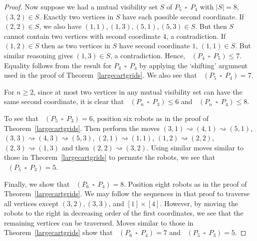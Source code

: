 \documentclass[10pt,a4paper]{amsart}
\DeclareMathOperator{\cmobmv}{Mob^*_{\mu}}
\DeclareMathOperator{\cp}{\,\square\,}
\DeclareMathOperator{\mobmv}{Mob_{\mu}}
\newcommand{\move}{\rightsquigarrow}
\begin{document}
\begin{proof}
		Now suppose we had a mutual visibility set $S$ of $P_5 \cp P_4$ with $|S| = 8$, $(3,2) \in S$. Exactly two vertices in $S$ have each possible second coordinate. If $(2,2) \in S$, we also have $(1,1), (1,3), (5,1), (5,3) \in S$. But then $S$ cannot contain two vertices with second coordinate $4$, a contradiction. If $(1,2) \in S$ then as two vertices in $S$ have second coordinate $1$, $(1,1) \in S$. But similar reasoning gives $(1,3) \in S$, a contradiction. Hence, $\mobmv(P_4 \cp P_5) \leq 7$. Equality follows from the result for $P_4 \cp P_4$ by applying the `shifting' argument used in the proof of Theorem~\ref{largecartgrids}. We also see that $\cmobmv(P_5 \cp P_4) = 7$.
		
		For $n \geq 2$, since at most two vertices in any mutual visibility set can have the same second coordinate, it is clear that $\mobmv(P_n \cp P_3) \leq 6$ and $\mobmv(P_n \cp P_4) \leq 8$.
		
		To see that $\mobmv(P_5 \cp P_3) = 6$, position six robots as in the proof of Theorem~\ref{largecartgrids}. Then perform the moves $(3,1) \move (4,1) \move (5,1)$, $(3,3) \move (4,3) \move (5,3)$, $(2,1) \move (1,1)$, $(1,2) \move (2,2)$, $(2,3) \move (1,3)$ and then $(2,2) \move (3,2)$. Using similar moves similar to those in Theorem~\ref{largecartgrids} to permute the robots, we see that $\cmobmv(P_5 \cp P_3) = 5$.
		
		Finally, we show that $\mobmv(P_6 \cp P_4) = 8$. Position eight robots as in the proof of Theorem~\ref{largecartgrids}. We may follow the sequences in that proof to traverse all vertices except $(3,2), (3,3)$, and $[1] \times [4]$. However, by moving the robots to the right in decreasing order of the first coordinates, we see that the remaining vertices can be traversed. Moves similar to those in Theorem~\ref{largecartgrids} show that $\mobmv(P_6 \cp P_4) = 7$ and $\mobmv(P_5 \cp P_3) = 5$.
	\end{proof}
\end{document}
